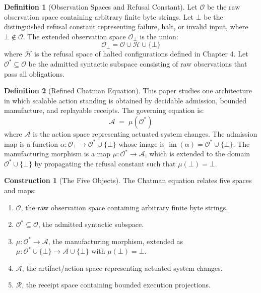 \documentclass[11pt,oneside]{book}
\theoremstyle{definition}
\newtheorem{definition}{Definition}[chapter]
\newtheorem{construction}{Construction}[chapter]
\theoremstyle{plain}
\theoremstyle{remark}
\newcommand{\Obs}{\mathcal{O}}                 %
\newcommand{\Obsbot}{\Obs_{\bot}}             %
\newcommand{\Act}{\mathcal{A}}                 %
\newcommand{\Rec}{\mathcal{R}}                 %
\newcommand{\muop}{\mu}                        %
\newcommand{\adm}{\alpha}                      %
\newcommand{\Rfsl}{\bot}                        %
\DeclareMathOperator{\im}{im}
\begin{document}
\begin{definition}[Observation Spaces and Refusal Constant]\label{def:obs_spaces}
Let $\Obs$ be the raw observation space containing arbitrary finite byte strings. %
Let $\Rfsl$ be the distinguished refusal constant representing failure, halt, or invalid input, where $\Rfsl \notin \Obs$. %
The extended observation space $\Obsbot$ is the union:
\[
\Obsbot = \Obs \cup \mathcal{H} \cup \{\Rfsl\}
\]
where $\mathcal{H}$ is the refusal space of halted configurations defined in Chapter 4. %
Let $\Obs^* \subseteq \Obs$ be the admitted syntactic subspace consisting of raw observations that pass all obligations. %
\end{definition}

\begin{definition}[Refined Chatman Equation]\label{def:chatman_eq}
This paper studies one architecture in which scalable action standing is obtained by decidable admission, bounded manufacture, and replayable receipts. %
The governing equation is:
\begin{equation}\label{eq:chatman_factored}
\boxed{\;\Act \;=\; \muop(\Obs^*)\;}
\end{equation}
where $\Act$ is the action space representing actuated system changes. %
The admission map is a function $\adm: \Obsbot \to \Obs^* \cup \{\Rfsl\}$ whose image is $\im(\adm) = \Obs^* \cup \{\Rfsl\}$. %
The manufacturing morphism is a map $\muop: \Obs^* \to \Act$, which is extended to the domain $\Obs^* \cup \{\Rfsl\}$ by propagating the refusal constant such that $\muop(\Rfsl) = \Rfsl$. %
\end{definition}

\begin{construction}[The Five Objects]\label{con:five_objects}
The Chatman equation relates five spaces and maps: %
\begin{enumerate}[label=(\roman*),leftmargin=*]
  \item $\Obs$, the raw observation space containing arbitrary finite byte strings. %
  \item $\Obs^* \subseteq \Obs$, the admitted syntactic subspace. %
  \item $\muop: \Obs^* \to \Act$, the manufacturing morphism, extended as $\muop: \Obs^* \cup \{\Rfsl\} \to \Act \cup \{\Rfsl\}$ with $\muop(\Rfsl) = \Rfsl$. %
  \item $\Act$, the artifact/action space representing actuated system changes. %
  \item $\Rec$, the receipt space containing bounded execution projections. %
\end{enumerate}
\end{construction}
\end{document}
